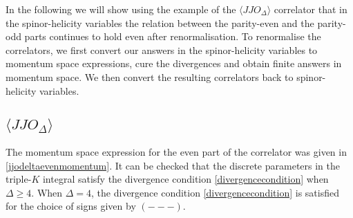 \documentclass[a4paper,11pt]{article}
\begin{document}
In the following we will show using the example of the $\langle JJO_\Delta\rangle$ correlator that  in the spinor-helicity variables the relation between the parity-even and the parity-odd parts continues to hold even after renormalisation.
To renormalise the correlators, we first convert our answers in the spinor-helicity variables to momentum space expressions, cure the divergences and obtain finite answers in momentum space. We then convert the resulting correlators back to spinor-helicity variables.  
\subsection{$\langle JJO_\Delta\rangle$}
The momentum space expression for the even part of the correlator was given in \eqref{jjodeltaevenmomentum}.
%
%
%
It can be checked that the discrete parameters in the triple-$K$ integral satisfy the divergence condition \eqref{divergencecondition} when $\Delta\ge 4$. When $\Delta=4$, the divergence condition \eqref{divergencecondition} is satisfied for the choice of signs given by $(---)$. 
\end{document}
